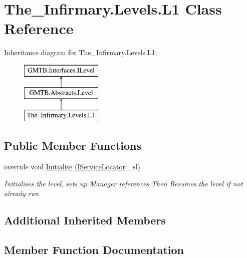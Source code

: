 \hypertarget{class_the___infirmary_1_1_levels_1_1_l1}{}\section{The\+\_\+\+Infirmary.\+Levels.\+L1 Class Reference}
\label{class_the___infirmary_1_1_levels_1_1_l1}
Inheritance diagram for The\+\_\+\+Infirmary.\+Levels.\+L1\+:\begin{figure}[H]
\begin{center}
\leavevmode
\includegraphics[height=3.000000cm]{class_the___infirmary_1_1_levels_1_1_l1}
\end{center}
\end{figure}
\subsection*{Public Member Functions}
\begin{DoxyCompactItemize}
\item 
override void \mbox{\hyperlink{class_the___infirmary_1_1_levels_1_1_l1_a323ed6642d397f9f04608ff0cf42bfd3}{Initialise}} (\mbox{\hyperlink{interface_g_m_t_b_1_1_interfaces_1_1_i_service_locator}{I\+Service\+Locator}} \+\_\+sl)
\begin{DoxyCompactList}\small\item\em Initialises the level, sets up Manager references Then Resumes the level if not already run \end{DoxyCompactList}\end{DoxyCompactItemize}
\subsection*{Additional Inherited Members}


\subsection{Member Function Documentation}
\mbox{\label{class_the___infirmary_1_1_levels_1_1_l1_a323ed6642d397f9f04608ff0cf42bfd3}} 
